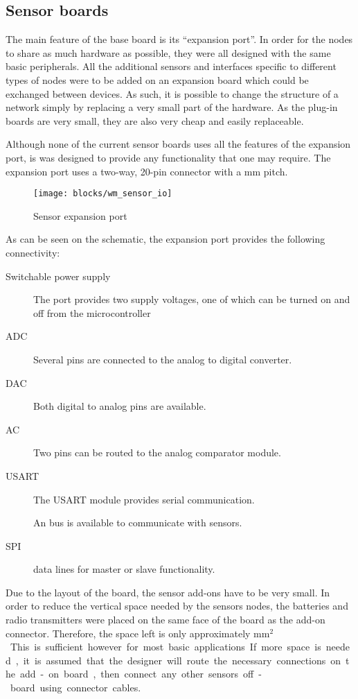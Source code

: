 \subsection{Sensor boards}

The main feature of the base board is its ``expansion port''. In order for the
nodes to share as much hardware as possible, they were all designed with the
same basic peripherals. All the additional sensors and interfaces specific to
different types of nodes were to be added on an expansion board which could be
exchanged between devices. As such, it is possible to change the structure of a
network simply by replacing a very small part of the hardware. As the plug-in
boards are very small, they are also very cheap and easily replaceable.

Although none of the current sensor boards uses all the features of the
expansion port, is was designed to provide any functionality that one may
require. The expansion port uses a two-way, 20-pin connector with a \unit[2]{mm}
pitch.

\begin{figure}[hp]
  \begin{center}
    \texttt{[image: blocks/wm\_sensor\_io]}
  \end{center}
  \caption{Sensor expansion port}
  \label{fig:sensor-io}
\end{figure}

As can be seen on the schematic, the expansion port provides the following
connectivity:
\begin{description}
  \item [Switchable power supply] The port provides two supply voltages, one of
    which can be turned on and off from the microcontroller
  \item[ADC] Several pins are connected to the analog to digital converter.
  \item[DAC] Both digital to analog pins are available.
  \item[AC] Two pins can be routed to the analog comparator module.
  \item[USART] The USART module provides serial communication.
  \item[\IIC{}] An \IIC{} bus is available to communicate with sensors.
  \item[SPI] data lines for master or slave functionality.
\end{description}

Due to the layout of the board, the sensor add-ons have to be very small. In
order to reduce the vertical space needed by the sensors nodes, the batteries
and radio transmitters were placed on the same face of the board as the add-on
connector. Therefore, the space left is only approximately \unit[25x25]{mm$^2$}.
This is sufficient however for most basic applications. If more space is needed,
it is assumed that the designer will route the necessary connections on the
add-on board, then connect any other sensors off-board using connector cables.


